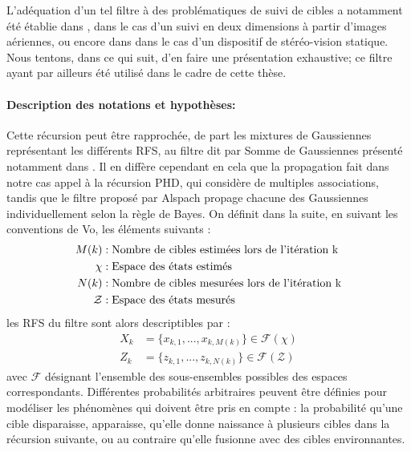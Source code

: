 L'adéquation d'un tel filtre à des problématiques de suivi de cibles a notamment été établie dans \cite{Pollard2009a}, dans le cas d'un suivi en deux dimensions à partir d'images aériennes, ou encore dans \cite{Ivekovic2009, Chen2011} dans le cas d'un dispositif de stéréo-vision statique. Nous tentons, dans ce qui suit, d'en faire une présentation exhaustive; ce filtre ayant par ailleurs été utilisé dans le cadre de cette thèse.

\paragraph{Description des notations et hypothèses:\\}
Cette récursion peut être rapprochée, de part les mixtures de Gaussiennes représentant les différents RFS, au filtre dit par \og Somme de Gaussiennes\fg{} présenté notamment dans \cite{Alspach1972}. Il en diffère cependant en cela que la propagation fait dans notre cas appel à la récursion PHD, qui considère de multiples associations, tandis que le filtre proposé par Alspach propage chacune des Gaussiennes individuellement selon la règle de Bayes. On définit dans la suite, en suivant les conventions de Vo, les éléments suivants : 
\begin{align}
	M(k) 	&: \textnormal{Nombre de cibles estimées lors de l'itération k} \\
	\chi	&: \textnormal{Espace des états estimés} \\
	N(k) 	&: \textnormal{Nombre de cibles mesurées lors de l'itération k} \\
	\mathcal{Z} &: \textnormal{Espace des états mesurés}
\end{align}
les RFS du filtre sont alors descriptibles par :
\begin{align}
	X_k &= \{ x_{k,1}, ..., x_{k,M(k)} \} \in \mathcal{F} ( \chi 				) \\
	Z_k &= \{ z_{k,1}, ..., z_{k,N(k)} \} \in \mathcal{F} ( \mathcal{Z} )
\end{align}
avec $\mathcal{F}$ désignant l'ensemble des sous-ensembles possibles des espaces correspondants. Différentes probabilités arbitraires peuvent être définies pour modéliser les phénomènes qui doivent être pris en compte : la probabilité qu'une cible disparaisse, apparaisse, qu'elle donne naissance à plusieurs cibles dans la récursion suivante, ou au contraire qu'elle fusionne avec des cibles environnantes.\\

